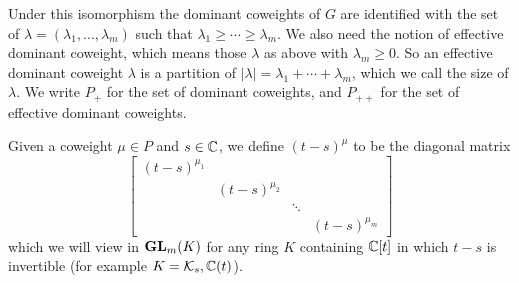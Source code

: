 \documentclass[draft]{article}
\begin{document}
Under this isomorphism the dominant coweights of $ G $ 
are identified with the set of $ \lambda = (\lambda_1, \dots, \lambda_m) $ such that $ \lambda_1 \ge \cdots \ge \lambda_m$. 
We also need the notion of effective dominant coweight, 
which means those $ \lambda $ as above with $ \lambda_m \ge 0$.  So an effective dominant coweight $ \lambda $ is a partition of $|\lambda| = \lambda_1 + \cdots + \lambda_m$, which we call the size of $ \lambda$. We write $P_+$ for the set of dominant coweights, and $P_{++}$ for the set of effective dominant coweights. 

% 



Given a coweight $\mu \in P$ and $ s\in \mathbb C$, we define $ (t-s)^\mu$ to be the diagonal matrix 
\[
\begin{bmatrix}
    (t-s)^{\mu_1} \\
    & (t-s)^{\mu_2} \\ 
    & & \ddots \\
    & & & (t-s)^{\mu_m}
\end{bmatrix} 
\]
which we will view in ${\mathbf{GL}}_m(K) $ for any ring $ K $ containing $\mathbb C[t]$ in which $t-s$ is invertible (for example $ K = \mathcal K_s, \mathbb C(t)$). %
\end{document}
